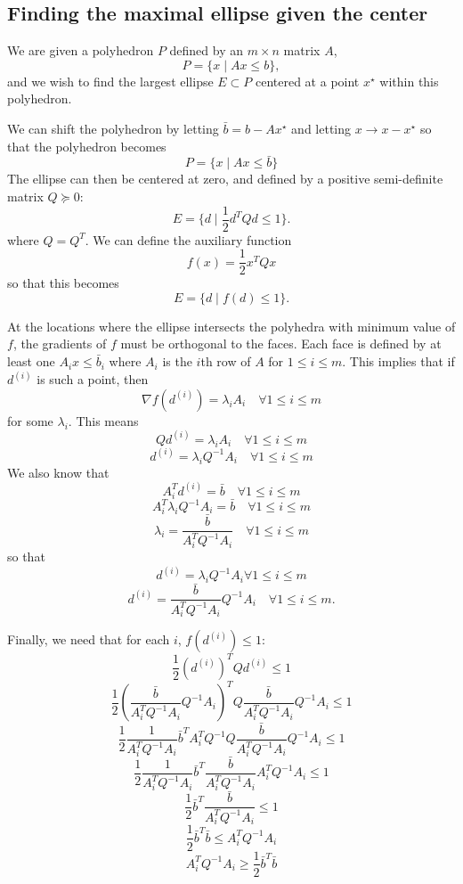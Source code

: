\documentclass{article}
\begin{document}
\subsection{Finding the maximal ellipse given the center}




We are given a polyhedron $P$ defined by an $m \times n$ matrix $A$,
\[
P = \{ x \; | \;  Ax \le b \},
\]
and we wish to find the largest ellipse $E \subset P$ centered at a point $x^{\star}$ within this polyhedron.

We can shift the polyhedron by letting $\bar{b} = b - Ax^{\star}$ and letting $x \to x - x^{\star}$ so that the polyhedron becomes
\[
P = \{ x \; | \;  Ax \le \bar{b} \}
\]
The ellipse can then be centered at zero, and defined by a positive semi-definite matrix $Q \succeq 0$:
\[
E = \{ d \; | \; \frac 1 2 d^T Q d \le 1 \}.
\]
where $Q = Q^T$.
We can define the auxiliary function 
\[
f(x) = \frac 1 2 x^T Q x
\]
so that this becomes
\[
E = \{ d \; | \; f(d) \le 1 \}.
\]


At the locations where the ellipse intersects the polyhedra with minimum value of $f$, the gradients of $f$ must be orthogonal to the faces.
Each face is defined by at least one $A_i x \le \bar{b}_i$ where $A_i$ is the $i$th row of $A$ for $1\le i \le m$.
This implies that if $d^{(i)}$ is such a point, then
\[
\nabla f(d^{(i)}) = \lambda_i A_i \quad \forall 1\le i\le m
\]
for some $\lambda_i$.
This means
\[
Q d^{(i)} = \lambda_i A_i \quad \forall 1\le i\le m
\]
\[
d^{(i)} = \lambda_i Q^{-1}A_i \quad \forall 1\le i\le m
\]
We also know that 
\[
A_i^T d^{(i)} = \bar{b} \quad \forall 1\le i\le m
\]
\[
A_i^T \lambda_i Q^{-1}A_i = \bar{b} \quad \forall 1\le i\le m
\]
\[
\lambda_i = \frac {\bar{b}}{A_i^T  Q^{-1}A_i} \quad \forall 1\le i\le m
\]
so that 
\[
d^{(i)} = \lambda_i Q^{-1}A_i \forall 1\le i\le m
\]
\[
d^{(i)} = \frac {\bar{b}}{A_i^T  Q^{-1}A_i}  Q^{-1}A_i \quad \forall 1\le i\le m.
\]

Finally, we need that for each $i$, $f(d^{(i)}) \le 1$:
\[
\frac 1 2 (d^{(i)})^{T} Q d^{(i)} \le 1
\]
\[
\frac 1 2 (\frac {\bar{b}}{A_i^T  Q^{-1}A_i}  Q^{-1}A_i)^{T} Q \frac {\bar{b}}{A_i^T  Q^{-1}A_i}  Q^{-1}A_i \le 1
\]
\[
\frac 1 2 \frac {1}{A_i^T  Q^{-1}A_i}  \bar{b}^T A_i^T Q^{-1} Q \frac {\bar{b}}{A_i^T  Q^{-1}A_i}  Q^{-1}A_i \le 1
\]
\[
\frac 1 2 \frac {1}{A_i^T  Q^{-1}A_i}  \bar{b}^T \frac {\bar{b}}{A_i^T  Q^{-1}A_i}  A_i^T Q^{-1}A_i \le 1
\]
\[
\frac 1 2 \bar{b}^T \frac {\bar{b}}{A_i^T  Q^{-1}A_i} \le 1
\]
\[
\frac 1 2 \bar{b}^T \bar{b}\le A_i^T  Q^{-1}A_i
\]
\[
A_i^T  Q^{-1}A_i \ge \frac 1 2 \bar{b}^T \bar{b}
\]
\end{document}
